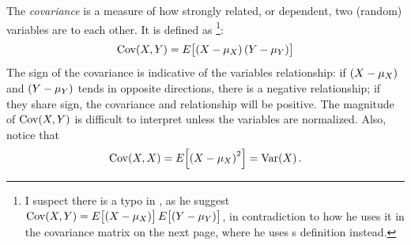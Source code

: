 \documentclass[british]{article}
\newcommand{\Cov}{\mathrm{Cov}\!\del}
\newcommand{\E}{E\!\sbr}
\begin{document}
 The \emph{covariance} is a measure of how
strongly related, or dependent, two (random) variables are to each
other. It is defined as \autocites[32]{marsland}[247]{devore-berk}\footnote{I
suspect there is a typo in \citeauthor{marsland}, as he suggest
$\Cov{X,Y} = \E{\del{X-\mu_X}}\E{\del{Y-\mu_Y}}$, in
contradiction to how he uses it in the covariance matrix on the next page,
where he uses \citeauthor{devore-berk}s definition instead.}:
$$ \Cov{X,Y} = \E{\del{X-\mu_X}\del{Y-\mu_Y}} $$
The sign of the covariance is indicative of the variables relationship: if
$\del{X-\mu_X}$ and $\del{Y-\mu_Y}$ tends in opposite directions, there is a
negative relationship; if they share sign, the covariance and relationship will
be positive. The magnitude of $\Cov{X,Y}$ is difficult to interpret
unless the variables are normalized. Also, notice that $$\Cov{X,X} =
\E{\del{X-\mu_X}^2} = \mathrm{Var}\!\del{X}.$$
\end{document}
